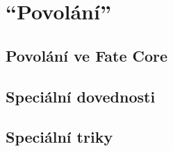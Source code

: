 
\chapter{``Povolání''}
\label{chap:speciality}

\section{Povolání ve Fate Core}
\label{sec:povolani-fate-core}

\section{Speciální dovednosti}
\label{sec:specialni-dovednosti}

\section{Speciální triky}
\label{sec:specialni-triky}


